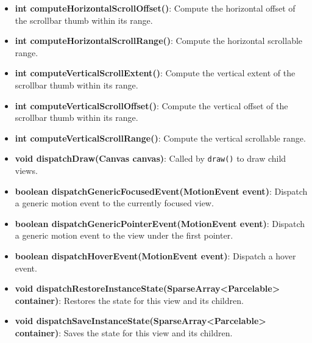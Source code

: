 \documentclass{report}
\begin{document}
\begin{itemize}
\begin{itemize}
                \item \textbf{int computeHorizontalScrollOffset()}:  
                    Compute the horizontal offset of the scrollbar thumb within its range.

                \item \textbf{int computeHorizontalScrollRange()}:  
                    Compute the horizontal scrollable range.

                \item \textbf{int computeVerticalScrollExtent()}:  
                    Compute the vertical extent of the scrollbar thumb within its range.

                \item \textbf{int computeVerticalScrollOffset()}:  
                    Compute the vertical offset of the scrollbar thumb within its range.

                \item \textbf{int computeVerticalScrollRange()}:  
                    Compute the vertical scrollable range.

                \item \textbf{void dispatchDraw(Canvas canvas)}:  
                    Called by \texttt{draw()} to draw child views.

                \item \textbf{boolean dispatchGenericFocusedEvent(MotionEvent event)}:  
                    Dispatch a generic motion event to the currently focused view.

                \item \textbf{boolean dispatchGenericPointerEvent(MotionEvent event)}:  
                    Dispatch a generic motion event to the view under the first pointer.

                \item \textbf{boolean dispatchHoverEvent(MotionEvent event)}:  
                    Dispatch a hover event.

                \item \textbf{void dispatchRestoreInstanceState(SparseArray<Parcelable> container)}:  
                    Restores the state for this view and its children.

                \item \textbf{void dispatchSaveInstanceState(SparseArray<Parcelable> container)}:  
                    Saves the state for this view and its children.


\end{itemize}
\end{itemize}
\end{document}
